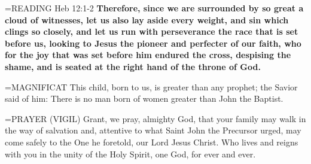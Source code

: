 \hangindent=\parindent \small{READING} Heb 12:1-2 \textbf{Therefore, since we are surrounded by so great a
cloud of witnesses, let us also lay aside every weight, and sin which
clings so closely, and let us run with perseverance the race that is set
before us, looking to Jesus the pioneer and perfecter of our faith,
who for the joy that was set before him endured the cross, despising
the shame, and is seated at the right hand of the throne of God.\\}
 
\hangindent=\parindent \small{MAGNIFICAT  This child, born to us, is greater than any prophet; the
Savior said of him: There is no man born of women greater than
John the Baptist.\\}
 
\hangindent=\parindent \small{PRAYER 
(VIGIL) Grant, we pray, almighty God,
that your family may walk in the way of salvation
and, attentive to what Saint John the Precursor urged,
may come safely to the One he foretold,
our Lord Jesus Christ.
Who lives and reigns with you in the unity of the Holy Spirit,
one God, for ever and ever.\\}
 
